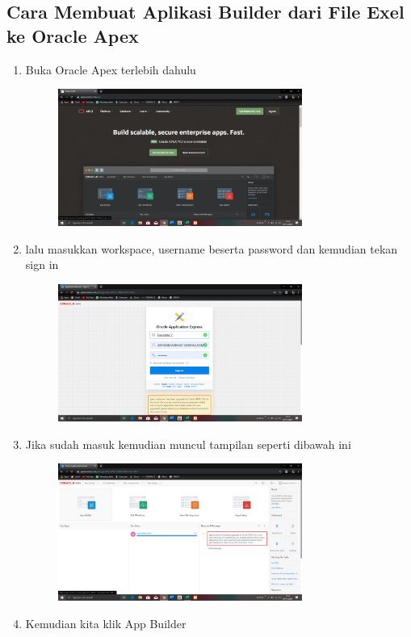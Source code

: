 \documentclass{article}
\begin{document}
\begin{enumerate}
\section{Cara Membuat Aplikasi Builder dari File Exel ke Oracle Apex}
\begin{enumerate}
    \newpage \item Buka Oracle Apex terlebih dahulu
    \begin{figure} [h]
\newpage \centerline{\includegraphics[width=8cm]{figure/59a.png}}
\end{figure}
    \item lalu masukkan workspace, username beserta password dan kemudian tekan sign in
    \begin{figure} [h]
\centerline{\includegraphics[width=8cm]{figure/60.png}}
\end{figure}
    \newpage \item Jika sudah masuk kemudian muncul tampilan seperti dibawah ini
    \begin{figure} [h]
\newpage \centerline{\includegraphics[width=8cm]{figure/61.png}}
\end{figure}
    \item Kemudian kita klik App Builder

\end{enumerate}
\end{enumerate}
\end{document}
